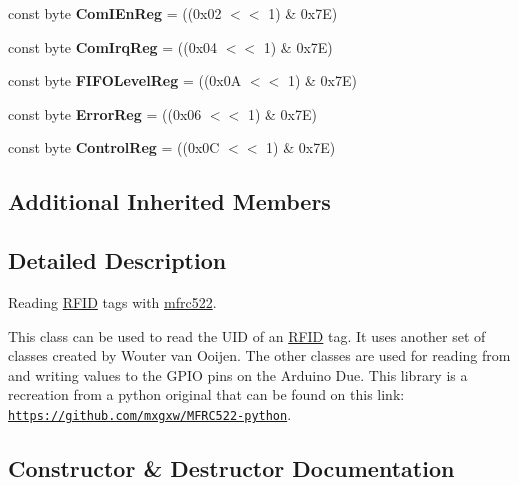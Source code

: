 \begin{DoxyCompactItemize}
\item 
const byte {\bfseries Com\+I\+En\+Reg} = ((0x02 $<$$<$ 1) \& 0x7\+E)\hypertarget{classmfrc522_a746894aa1857a071ab9573ecf07621a0}{}\label{classmfrc522_a746894aa1857a071ab9573ecf07621a0}

\item 
const byte {\bfseries Com\+Irq\+Reg} = ((0x04 $<$$<$ 1) \& 0x7\+E)\hypertarget{classmfrc522_a4fb04a221dc26dee599d32119eebe0cc}{}\label{classmfrc522_a4fb04a221dc26dee599d32119eebe0cc}

\item 
const byte {\bfseries F\+I\+F\+O\+Level\+Reg} = ((0x0\+A $<$$<$ 1) \& 0x7\+E)\hypertarget{classmfrc522_a75a41a00f61652eec99c887d98df8ed4}{}\label{classmfrc522_a75a41a00f61652eec99c887d98df8ed4}

\item 
const byte {\bfseries Error\+Reg} = ((0x06 $<$$<$ 1) \& 0x7\+E)\hypertarget{classmfrc522_a91f4e4c517d9f583250a6f5b022c590d}{}\label{classmfrc522_a91f4e4c517d9f583250a6f5b022c590d}

\item 
const byte {\bfseries Control\+Reg} = ((0x0\+C $<$$<$ 1) \& 0x7\+E)\hypertarget{classmfrc522_ad2e13b4fb8a39ed0200b467666266346}{}\label{classmfrc522_ad2e13b4fb8a39ed0200b467666266346}

\end{DoxyCompactItemize}
\subsection*{Additional Inherited Members}


\subsection{Detailed Description}
Reading \hyperlink{class_r_f_i_d}{R\+F\+ID} tags with \hyperlink{classmfrc522}{mfrc522}. 

This class can be used to read the U\+ID of an \hyperlink{class_r_f_i_d}{R\+F\+ID} tag. It uses another set of classes created by Wouter van Ooijen. The other classes are used for reading from and writing values to the G\+P\+IO pins on the Arduino Due. This library is a recreation from a python original that can be found on this link\+: \href{https://github.com/mxgxw/MFRC522-python}{\tt https\+://github.\+com/mxgxw/\+M\+F\+R\+C522-\/python}. 

\subsection{Constructor \& Destructor Documentation}
